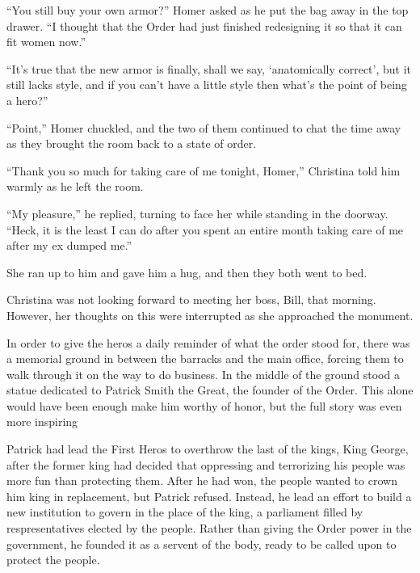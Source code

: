 \documentclass[showtrims,b6paper,draft,10pt]{memoir}
\begin{document}
``You still buy your own armor?'' Homer asked as he put the bag away in the top drawer.  ``I thought that the Order had just finished redesigning it so that it can fit women now.''

``It's true that the new armor is finally, shall we say, `anatomically correct', but it still lacks style, and if you can't have a little style then what's the point of being a hero?''

``Point,'' Homer chuckled, and the two of them continued to chat the time away as they brought the room back to a state of order.

``Thank you so much for taking care of me tonight, Homer,''  Christina told him warmly as he left the room.

``My pleasure,'' he replied, turning to face her while standing in the doorway.  ``Heck, it is the least I can do after you spent an entire month taking care of me after my ex dumped me.''

She ran up to him and gave him a hug, and then they both went to bed.

\timeskip

Christina was not looking forward to meeting her boss, Bill, that morning.  However, her thoughts on this were interrupted as she approached the monument.

In order to give the heros a daily reminder of what the order stood for, there was a memorial ground in between the barracks and the main office, forcing them to walk through it on the way to do business.  In the middle of the ground stood a statue dedicated to Patrick Smith the Great, the founder of the Order.  This alone would have been enough make him worthy of honor, but the full story was even more inspiring

Patrick had lead the First Heros to overthrow the last of the kings, King George, after the former king had decided that oppressing and terrorizing his people was more fun than protecting them.  After he had won, the people wanted to crown him king in replacement, but Patrick refused.  Instead, he lead an effort to build a new institution to govern in the place of the king, a parliament filled by respresentatives elected by the people.  Rather than giving the Order power in the government, he founded it as a servent of the body, ready to be called upon to protect the people.
\end{document}
